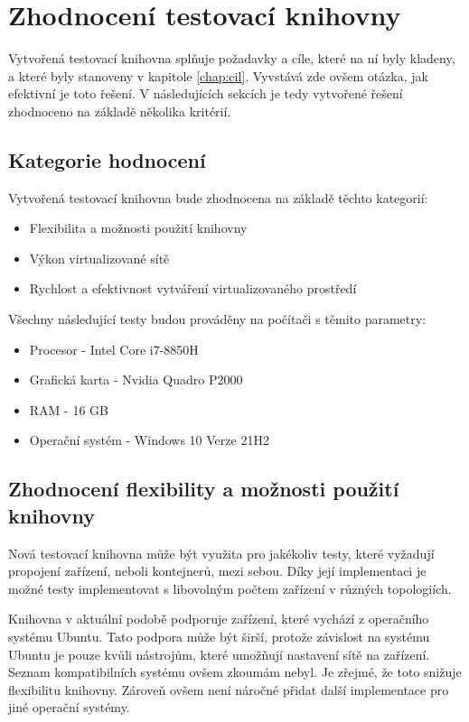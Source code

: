 \chapter{Zhodnocení testovací knihovny}\label{chap:review}

Vytvořená testovací knihovna splňuje požadavky a cíle, které na ní byly kladeny, a které byly stanoveny v kapitole \ref{chap:cil}. Vyvstává zde ovšem otázka, jak efektivní je toto řešení. V následujících sekcích je tedy vytvořené řešení zhodnoceno na základě několika kritérií.

\section{Kategorie hodnocení}

Vytvořená testovací knihovna bude zhodnocena na základě těchto kategorií:

\begin{itemize}
    \item Flexibilita a možnosti použití knihovny
    \item Výkon virtualizované sítě
    \item Rychlost a efektivnost vytváření virtualizovaného prostředí
\end{itemize}

\noindent Všechny následující testy budou prováděny na počítači s těmito parametry:

\begin{itemize}
    \item Procesor - Intel Core i7-8850H
    \item Grafická karta - Nvidia Quadro P2000
    \item RAM - 16 GB
    \item Operační systém - Windows 10 Verze 21H2
\end{itemize}


\section{Zhodnocení flexibility a možnosti použití knihovny}
Nová testovací knihovna může být využita pro jakékoliv testy, které vyžadují propojení zařízení, neboli kontejnerů, mezi sebou. Díky její implementaci je možné testy implementovat s libovolným počtem zařízení v různých topologiích.

Knihovna v aktuální podobě podporuje zařízení, které vychází z operačního systému Ubuntu. Tato podpora může být širší, protože závislost na systému Ubuntu je pouze kvůli nástrojům, které umožňují nastavení sítě na zařízení. Seznam kompatibilních systému ovšem zkoumám nebyl. Je zřejmé, že toto snižuje flexibilitu knihovny. Zároveň ovšem není náročné přidat další implementace pro jiné operační systémy. 

